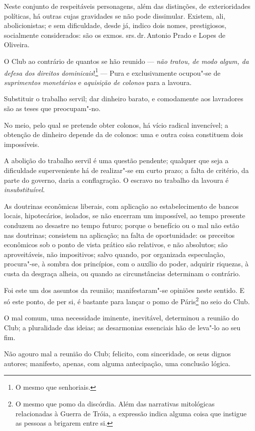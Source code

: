 Neste conjunto de respeitáveis personagens, além das distinções, de
exterioridades políticas, há outras cujas gravidades se não pode
dissimular. Existem, ali, abolicionistas; e sem dificuldade, desde já,
indico dois nomes, prestigiosos, socialmente considerados: são os exmos.
srs.\,dr.\,Antonio Prado e Lopes de Oliveira.

O Club ao contrário de quantos se hão reunido --- \emph{não tratou, de
modo algum, da defesa dos direitos dominicais}!\footnote{O mesmo que
  senhoriais.} --- Pura e exclusivamente ocupou"-se de \emph{suprimentos
monetários} e \emph{aquisição de colonos} para a lavoura.

Substituir o trabalho servil; dar dinheiro barato, e comodamente aos
lavradores são as teses que preocupam"-no.

No meio, pelo qual se pretende obter colonos, há vício radical
invencível; a obtenção de dinheiro depende da de colonos: uma e outra
coisa constituem dois impossíveis.

A abolição do trabalho servil é uma questão pendente; qualquer que seja
a dificuldade superveniente há de realizar"-se em curto prazo; a falta de
critério, da parte do governo, daria a conflagração. O escravo no
trabalho da lavoura é \emph{insubstituível}.

As doutrinas econômicas liberais, com aplicação ao estabelecimento de
bancos locais, hipotecários, isolados, se não encerram um impossível, ao
tempo presente conduzem ao desastre no tempo futuro; porque o benefício
ou o mal não estão nas doutrinas; consistem na aplicação; na falta de
oportunidade: os preceitos econômicos sob o ponto de vista prático são
relativos, e não absolutos; são aproveitáveis, não impositivos; salvo
quando, por organizada especulação, procura"-se, à sombra dos princípios,
com o auxílio do poder, adquirir riquezas, à custa da desgraça alheia,
ou quando as circunstâncias determinam o contrário.

Foi este um dos assuntos da reunião; manifestaram"-se opiniões neste
sentido. E só este ponto, de per si, é bastante para lançar o pomo de
Páris\footnote{O mesmo que pomo da discórdia. Além das narrativas
  mitológicas relacionadas à Guerra de Tróia, a expressão indica alguma
  coisa que instigue as pessoas a brigarem entre si.} no seio do Club.

O mal comum, uma necessidade iminente, inevitável, determinou a reunião
do Club; a pluralidade das ideias; as desarmonias essenciais hão de
leva"-lo ao seu fim.

Não agouro mal a reunião do Club; felicito, com sinceridade, os seus
dignos autores; manifesto, apenas, com alguma antecipação, uma conclusão
lógica.

